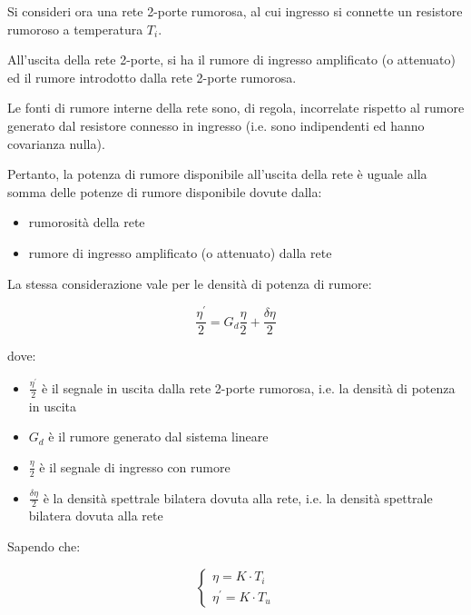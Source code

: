 Si consideri ora una rete 2-porte rumorosa, al cui ingresso si connette un resistore rumoroso a temperatura $T_i$. \newline 

All'uscita della rete 2-porte, si ha il rumore di ingresso amplificato (o attenuato) ed il rumore introdotto dalla rete 2-porte rumorosa. \newline 

Le fonti di rumore interne della rete sono, di regola, incorrelate rispetto al rumore generato dal resistore connesso in ingresso (i.e. sono indipendenti ed hanno covarianza nulla). \newline 

Pertanto, la potenza di rumore disponibile all'uscita della rete è uguale alla somma delle potenze di rumore disponibile dovute dalla: 

\begin{itemize}
    \item rumorosità della rete 
    \item rumore di ingresso amplificato (o attenuato) dalla rete
\end{itemize}

La stessa considerazione vale per le densità di potenza di rumore: 

{
    \Large 
    \begin{equation}
            \frac{\eta^{'}}{2} 
            = 
            G_d \frac{\eta}{2} + \frac{\delta \eta}{2} 
    \end{equation}
}

dove: 

\begin{itemize}
    \item $\frac{\eta^{'}}{2}$ è il segnale in uscita dalla rete 2-porte rumorosa, i.e. la densità di potenza in uscita
    \item $G_d$ è il rumore generato dal sistema lineare 
    \item  $\frac{\eta}{2}$ è il segnale di ingresso con rumore 
    \item $\frac{\delta \eta}{2}$ è la densità spettrale bilatera dovuta alla rete, i.e. la densità spettrale bilatera dovuta alla rete
\end{itemize}

Sapendo che: 

{
    \Large 
    \begin{equation}
        \begin{cases}
            \eta = K \cdot T_i 
            \\
            \eta^{'} = K \cdot T_u 
        \end{cases}
    \end{equation}
}

